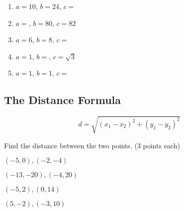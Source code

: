 \documentclass[12pt]{article}
\begin{document}
\begin{enumerate}
	\item $a=10$, \hspace{1in} $b=24$,\hspace{1in} $c=$\underline{\hspace{1in}}\\
	
	\item $a=$\underline{\hspace{1in}}, \hspace{.5cm} $b=80$,\hspace{1in} $c=82$\\
	
	\item $a=6$, \hspace{1in}$b=8$, \hspace{1in}$c=$\underline{\hspace{1in}}\\
	
	\item $a=1$, \hspace{1in}$b=$\underline{\hspace{1in}},\hspace{.5cm} $c=\sqrt{3}$\\
	
	\item $a=1$,\hspace{1in} $b=1$,\hspace{1in} $c=$\underline{\hspace{1in}}
\end{enumerate}


\hrulefill

\subsection*{The Distance Formula}

$$d=\sqrt{(x_{1}-x_{2})^{2}+(y_{1}-y_{2})^{2}}$$

Find the distance between the two points. (3 points each)\\

\begin{enumerate}[resume]
\begin{multicols}{2}

	
	\item $(-5,0),(-2,-4)$\\
	
	\item $(-13,-20),(-4,20)$\\
	
	\item $(-5,2), (0,14)$\\
	
	\item $(5,-2),(-3,10)$\\

\end{multicols}
\end{enumerate}
\end{document}
